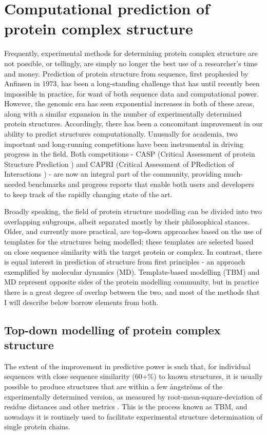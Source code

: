 \documentclass[a4paper,11pt,twoside,openright]{scrbook}
\begin{document}
\section{Computational prediction of protein complex structure}
Frequently, experimental methods for determining protein complex structure are not possible, or tellingly, are simply no longer the best use of a researcher's time and money. Prediction of protein structure from sequence, first prophesied by Anfinsen in 1973\cite{Anfinsen1973}, has been a long-standing challenge that has until recently been impossible in practice, for want of both sequence data and computational power. However, the genomic era has seen exponential increases in both of these areas, along with a similar expansion in the number of experimentally determined protein structures. Accordingly, there has been a concomitant improvement in our ability to predict structures computationally. Unusually for academia, two important and long-running competitions have been instrumental in driving progress in the field. Both competitions - CASP (Critical Assessment of protein Structure Prediction \cite{Moult1995}) and CAPRI (Critical Assessment of PRediction of Interactions \cite{Janin2003}) - are now an integral part of the community, providing much-needed benchmarks and progress reports that enable both users and developers to keep track of the rapidly changing state of the art.

Broadly speaking, the field of protein structure modelling can be divided into two overlapping subgroups, albeit separated mostly by their philosophical stances. Older, and currently more practical, are top-down approaches based on the use of templates for the structures being modelled; these templates are selected based on close sequence similarity with the target protein or complex. In contrast, there is equal interest in prediction of structure from first principles - an approach exemplified by molecular dynamics (MD). Template-based modelling (TBM) and MD represent opposite sides of the protein modelling community, but in practice there is a great degree of overlap between the two, and most of the methods that I will describe below borrow elements from both.

\subsection{Top-down modelling of protein complex structure}
The extent of the improvement in predictive power is such that, for individual sequences with close sequence similarity (60+\%) to known structures, it is usually possible to produce structures that are within a few ångströms of the experimentally determined version, as measured by root-mean-square-deviation of residue distances and other metrics \cite{Haas2013,Moult2016}. This is the process known as TBM, and nowadays it is routinely used to facilitate experimental structure determination of single protein chains.
\end{document}
